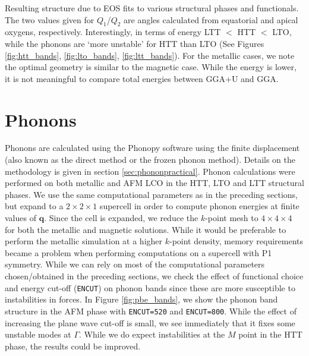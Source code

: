 \begin{table}
	\centering
	\caption[Simulation Structure Results]{Resulting structure due to EOS fits to various structural phases and functionals. The two values given for $Q_1$/$Q_2$ are angles calculated from equatorial and apical oxygens, respectively. Interestingly, in terms of energy LTT $<$ HTT $<$ LTO, while the phonons are `more unstable' for HTT than LTO (See Figures \ref{fig:htt_bands}, \ref{fig:lto_bands}, \ref{fig:ltt_bands}). For the metallic cases, we note the optimal geometry is similar to the magnetic case. While the energy is lower, it is not meaningful to compare total energies between GGA+U and GGA.}
    \label{tab:sim_struct}
    
\end{table}

\section{Phonons}
Phonons are calculated using the Phonopy software using the finite displacement (also known as the direct method or the frozen phonon method). Details on the methodology is given in section \ref{sec:phononpractical}. Phonon calculations were performed on both metallic and AFM LCO in the HTT, LTO and LTT structural phases. We use the same computational parameters as in the preceding sections, but expand to a $2 \times 2 \times 1$ supercell in order to compute phonon energies at finite values of $\bm{q}$. Since the cell is expanded, we reduce the $k$-point mesh to $4 \times 4 \times 4$ for both the metallic and magnetic solutions. While it would be preferable to perform the metallic simulation at a higher $k$-point density, memory requirements became a problem when performing computations on a supercell with P1 symmetry. While we can rely on most of the computational parameters chosen/obtained in the preceding sections, we check the effect of functional choice and energy cut-off (\texttt{ENCUT}) on phonon bands since these are more susceptible to instabilities in forces. In Figure \ref{fig:pbe_bands}, we show the phonon band structure in the AFM phase with \texttt{ENCUT=520} and \texttt{ENCUT=800}. While the effect of increasing the plane wave cut-off is small, we see immediately that it fixes some unstable modes at $\Gamma$. While we do expect instabilities at the $M$ point in the HTT phase, the results could be improved.


